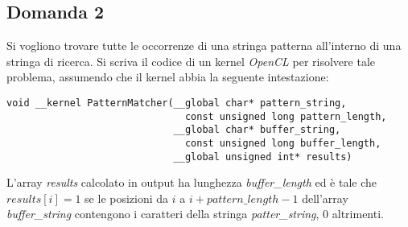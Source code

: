 \subsection{Domanda 2}
Si vogliono trovare tutte le occorrenze di una stringa patterna all'interno di una stringa di ricerca. Si scriva il codice di un kernel \textit{OpenCL} per risolvere tale problema, assumendo che il kernel abbia la seguente intestazione:
\begin{lstlisting}
void __kernel PatternMatcher(__global char* pattern_string,
                               const unsigned long pattern_length,
                             __global char* buffer_string,
                               const unsigned long buffer_length,
                             __global unsigned int* results)
\end{lstlisting}
L'array \textit{results} calcolato in output ha lunghezza \textit{buffer\_length} ed è tale che $results[i] = 1$ se le posizioni da $i$ a $i + pattern\_length - 1$ dell'array \textit{buffer\_string} contengono i caratteri della stringa \textit{patter\_string}, 0 altrimenti.
